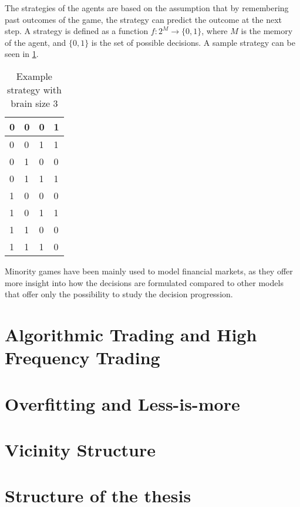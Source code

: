 The strategies of the agents are based on the assumption that by remembering past outcomes of the game, the strategy can predict the outcome at the next step.
A strategy is defined as a function $f:2^M\to\{0,1\}$, where $M$ is the memory of the agent, and $\{0,1\}$ is the set of possible decisions.
A sample strategy can be seen in \ref{table:minorityStrategy}.

\begin{table}
\centering
\begin{tabular}{|l|l|l||l|}
\hline
0 & 0 & 0 & 1   \\ \hline
0 & 0 & 1 & 1   \\ \hline
0 & 1 & 0 & 0   \\ \hline
0 & 1 & 1 & 1   \\ \hline
1 & 0 & 0 & 0   \\ \hline
1 & 0 & 1 & 1   \\ \hline
1 & 1 & 0 & 0   \\ \hline
1 & 1 & 1 & 0   \\ \hline
\end{tabular}
\caption{Example strategy with brain size 3}
\label{table:minorityStrategy}
\end{table}

Minority games have been mainly used to model financial markets, as they offer more insight into how the decisions are formulated compared to other models that offer only the possibility to study the decision progression.


\section{Algorithmic Trading and High Frequency Trading}
\label{1:finance}


\section{Overfitting and Less-is-more}
\label{1:overfitting}

\section{Vicinity Structure}
\label{1:vicinity}

\section{Structure of the thesis}